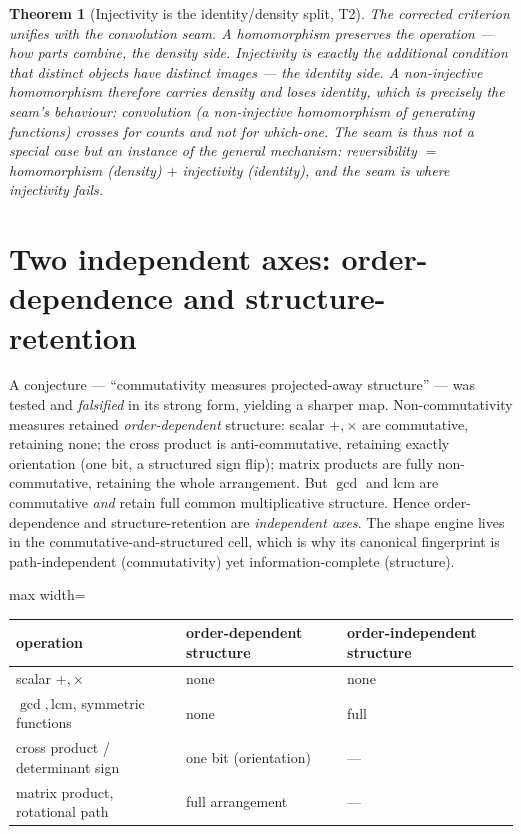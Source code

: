 \documentclass[11pt]{article}
\newtheorem{theorem}{Theorem}[section]
\begin{document}
\begin{theorem}[Injectivity is the identity/density split, T2]
The corrected criterion unifies with the convolution seam. A homomorphism preserves the operation --- how
parts combine, the \emph{density} side. Injectivity is exactly the additional condition that distinct objects
have distinct images --- the \emph{identity} side. A non-injective homomorphism therefore carries density and
loses identity, which is precisely the seam's behaviour: convolution (a non-injective homomorphism of
generating functions) crosses for counts and not for which-one. The seam is thus not a special case but an
instance of the general mechanism: \emph{reversibility $=$ homomorphism (density) $+$ injectivity (identity)},
and the seam is where injectivity fails.
\end{theorem}

\section{Two independent axes: order-dependence and structure-retention}

A conjecture --- ``commutativity measures projected-away structure'' --- was tested and \emph{falsified} in
its strong form, yielding a sharper map. Non-commutativity measures retained \emph{order-dependent} structure:
scalar $+,\times$ are commutative, retaining none; the cross product is anti-commutative, retaining exactly
orientation (one bit, a structured sign flip); matrix products are fully non-commutative, retaining the whole
arrangement. But $\gcd$ and $\mathrm{lcm}$ are commutative \emph{and} retain full common multiplicative
structure. Hence order-dependence and structure-retention are \emph{independent axes}. The shape engine lives
in the commutative-and-structured cell, which is why its canonical fingerprint is path-independent
(commutativity) yet information-complete (structure).

\begin{center}
\begin{adjustbox}{max width=\linewidth}\begin{tabular}{lll}
\toprule
operation & order-dependent structure & order-independent structure \\
\midrule
scalar $+,\times$ & none & none \\
$\gcd,\mathrm{lcm}$, symmetric functions & none & full \\
cross product / determinant sign & one bit (orientation) & --- \\
matrix product, rotational path & full arrangement & --- \\
\bottomrule
\end{tabular}\end{adjustbox}
\end{center}
\end{document}
